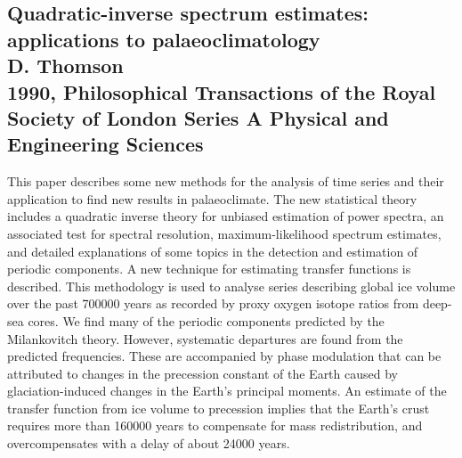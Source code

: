 \documentclass{article}
\begin{document}
\subsection{Quadratic-inverse spectrum estimates: applications to palaeoclimatology \\
D. Thomson \\
1990, Philosophical Transactions of the Royal Society of London Series A Physical and Engineering Sciences}
This paper describes some new methods for the analysis of time series and their application to find new results in palaeoclimate. The new statistical theory includes a quadratic inverse theory for unbiased estimation of power spectra, an associated test for spectral resolution, maximum-likelihood spectrum estimates, and detailed explanations of some topics in the detection and estimation of periodic components. A new technique for estimating transfer functions is described. This methodology is used to analyse series describing global ice volume over the past 700000 years as recorded by proxy oxygen isotope ratios from deep-sea cores. We find many of the periodic components predicted by the Milankovitch theory. However, systematic departures are found from the predicted frequencies. These are accompanied by phase modulation that can be attributed to changes in the precession constant of the Earth caused by glaciation-induced changes in the Earth’s principal moments. An estimate of the transfer function from ice volume to precession implies that the Earth’s crust requires more than 160000 years to compensate for mass redistribution, and overcompensates with a delay of about 24000 years.\\

\\
\end{document}
